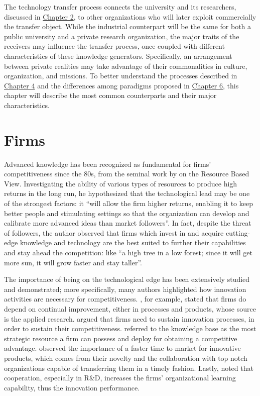 

\label{Chapter3} %

The technology transfer process connects the university and its researchers, discussed in \hyperref[Chapter2]{Chapter 2}, to other organizations who will later exploit commercially the transfer object. While the industrial counterpart will be the same for both a public university and a private research organization, the major traits of the receivers may influence the transfer process, once coupled with different characteristics of these knowledge generators. Specifically, an arrangement between private realities may take advantage of their commonalities in culture, organization, and missions. To better understand the processes described in \hyperref[Chapter4]{Chapter 4} and the differences among paradigms proposed in \hyperref[Chapter6]{Chapter 6}, this chapter will describe the most common counterparts and their major characteristics.

\section{Firms}

Advanced knowledge has been recognized as fundamental for firms' competitiveness since the 80s, from the seminal work by \citet{Wernerfelt1984} on the Resource Based View. Investigating the ability of various types of resources to produce high returns in the long run, he hypothesized that the technological lead may be one of the strongest factors: it \enquote{will allow the firm higher returns, enabling it to keep better people and stimulating settings so that the organization can develop and calibrate more advanced ideas than market followers}. In fact, despite the threat of followers, the author observed that firms which invest in and acquire cutting-edge knowledge and technology are the best suited to further their capabilities and stay ahead the competition: like \enquote{a high tree in a low forest; since it will get more sun, it will grow faster and stay taller}.

The importance of being on the technological edge has been extensively studied and demonstrated; more specifically, many authors highlighted how innovation activities are necessary for competitiveness. \citet{Beath2000}, for example, stated that firms do depend on continual improvement, either in processes and products, whose source is the applied research. \citet{Yusuf2008} argued that firms need to sustain innovation processes, in order to sustain their competitiveness. \citet{Jimenez2011} referred to the knowledge base as the most strategic resource a firm can possess and deploy for obtaining a competitive advantage. \citet{Siegel2003a} observed the importance of a faster time to market for innovative products, which comes from their novelty and the collaboration with top notch organizations capable of transferring them in a timely fashion. Lastly, \citet{AzagraCaro2010} noted that cooperation, especially in R\&D, increases the firms' organizational learning capability, thus the innovation performance. 

